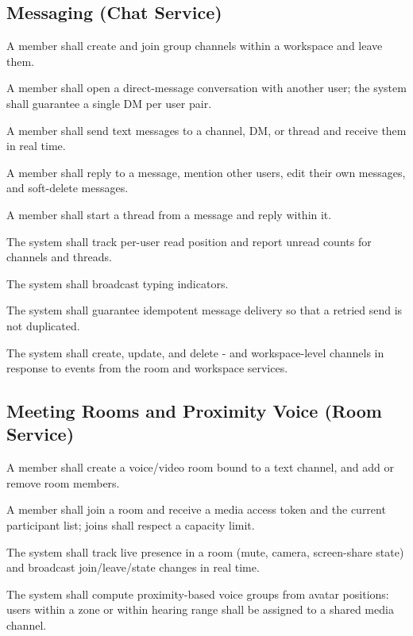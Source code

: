 \subsection{Messaging (Chat Service)}
\begin{description}[leftmargin=1.6cm,style=nextline]
  \item[FR-16] A member shall create and join group channels within a workspace
  and leave them.
  \item[FR-17] A member shall open a direct-message conversation with another
  user; the system shall guarantee a single DM per user pair.
  \item[FR-18] A member shall send text messages to a channel, DM, or thread and
  receive them in real time.
  \item[FR-19] A member shall reply to a message, mention other users, edit their
  own messages, and soft-delete messages.
  \item[FR-20] A member shall start a thread from a message and reply within it.
  \item[FR-21] The system shall track per-user read position and report unread
  counts for channels and threads.
  \item[FR-22] The system shall broadcast typing indicators.
  \item[FR-23] The system shall guarantee idempotent message delivery so that a
  retried send is not duplicated.
  \item[FR-24] The system shall create, update, and delete - and
  workspace-level channels in response to events from the room and workspace
  services.
\end{description}

\subsection{Meeting Rooms and Proximity Voice (Room Service)}
\begin{description}[leftmargin=1.6cm,style=nextline]
  \item[FR-25] A member shall create a voice/video room bound to a text channel,
  and add or remove room members.
  \item[FR-26] A member shall join a room and receive a media access token and
  the current participant list; joins shall respect a capacity limit.
  \item[FR-27] The system shall track live presence in a room (mute, camera,
  screen-share state) and broadcast join/leave/state changes in real time.
  \item[FR-28] The system shall compute proximity-based voice groups from avatar
  positions: users within a zone or within hearing range shall be assigned to a
  shared media channel.
\end{description}

